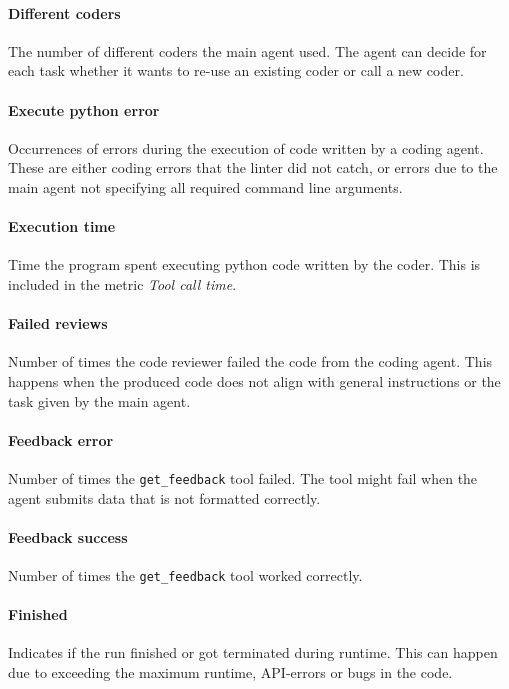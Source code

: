 \documentclass[submission, Phys]{SciPost}
\begin{document}
\paragraph{Different coders} The number of different coders the main agent used. The agent can decide for each task whether it wants to re-use an existing coder or call a new coder. 

\paragraph{Execute python error} Occurrences of errors during the execution of code written by a coding agent. These are either coding errors that the linter did not catch, or errors due to the main agent not specifying all required command line arguments.

\paragraph{Execution time} Time the program spent executing python code written by the coder. This is included in the metric \emph{Tool call time}.

\paragraph{Failed reviews} Number of times the code reviewer failed the code from the coding agent. This happens when the produced code does not align with general instructions or the task given by the main agent.

\paragraph{Feedback error} Number of times the \verb|get_feedback| tool failed. The tool might fail when the agent submits data that is not formatted correctly.

\paragraph{Feedback success}  Number of times the \verb|get_feedback| tool worked correctly. 

\paragraph{Finished} Indicates if the run finished or got terminated during runtime. This can happen due to exceeding the maximum runtime, API-errors or bugs in the code.
\end{document}
